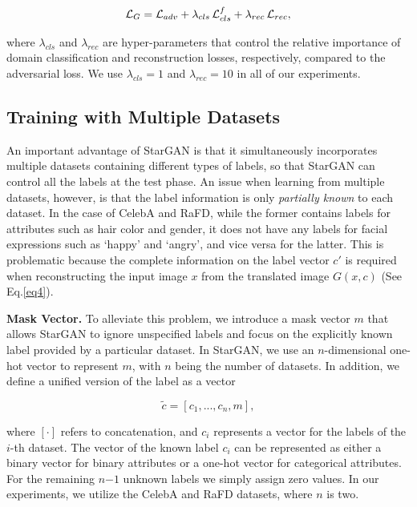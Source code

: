 \begin{equation}
\mathcal{L}_{G} =   \mathcal {L}_{adv} +  {\lambda}_{cls}\thinspace\mathcal{L}_{cls}^{f} + 
{\lambda}_{rec}\thinspace\mathcal{L}_{rec},
\end{equation}

where ${\lambda}_{cls}$ and ${\lambda}_{rec}$ are hyper-parameters that control the relative importance of domain classification and reconstruction losses, respectively, compared to the adversarial loss. We use ${\lambda}_{cls} = 1$ and ${\lambda}_{rec} = 10$ in all of our experiments. 

\medskip

\subsection{Training with Multiple Datasets} \label{section 3.2} An important advantage of StarGAN is that it simultaneously incorporates multiple datasets containing different types of labels, so that StarGAN can control all the labels at the test phase. An issue when learning from multiple datasets, however, is that the label information is only \textit{partially known} to each dataset. In the case of CelebA\thinspace\cite{liu2015faceattributes} and RaFD\thinspace\cite{langner2010presentation}, while the former contains labels for attributes such as hair color and gender, it does not have any labels for facial expressions such as `happy' and `angry', and vice versa for the latter. This is problematic because the complete information on the label vector $c'$ is required when reconstructing the input image $x$ from the translated image $G(x, c)$ (See Eq.\thinspace\eqref{eq4}). 

\medskip

\textbf{Mask Vector.} To alleviate this problem, we introduce a mask vector $m$ that allows StarGAN to ignore unspecified labels and focus on the explicitly known label provided by a particular dataset. In StarGAN, we use an $n$-dimensional one-hot vector to represent $m$, with $n$ being the number of datasets. In addition, we define a unified version of the label as a vector

\begin{equation}
\tilde{c} = [{c}_{1}, ..., {c}_{n}, m],
\label{eq7}
\end{equation}

 where $[\cdot]$ refers to concatenation, and ${c}_{i}$ represents a vector for the labels of the $i$-th dataset. The vector of the known label ${c}_{i}$ can be represented as either a binary vector for binary attributes or a one-hot vector for categorical attributes. For the remaining $n \mathbb{-} 1$ unknown labels we simply assign zero values. In our experiments, we utilize the CelebA and RaFD datasets, where $n$ is two. 

